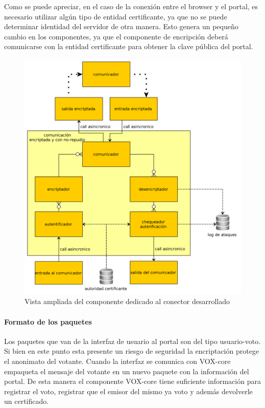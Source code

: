 Como se puede apreciar, en el caso de la conexión entre el browser y el portal, es necesario utilizar algún tipo de entidad certificante, ya que no se puede determinar identidad del servidor de otra manera. Esto genera un pequeño cambio en los componentes, ya que el componente de encripción deberá comunicarse con la entidad certificante para obtener la clave pública del portal.

\begin{figure}[H]
	\begin{center}
		\includegraphics[scale=0.26]{../diagramas/conector.png}
		\caption{Vista ampliada del componente dedicado al conector desarrollado}
	\end{center} 
\end{figure} 

\paragraph{Formato de los paquetes} Los paquetes que van de la interfaz de usuario al portal son del tipo usuario-voto. Si bien en este punto esta presente un riesgo de seguridad la encriptación protege el anonimato del votante. Cuando la interfaz se comunica con VOX-core empaqueta el mensaje del votante en un nuevo paquete con la información del portal. De esta manera el componente VOX-core tiene suficiente información para registrar el voto, registrar que el emisor del mismo ya voto y además devolverle un certificado.


